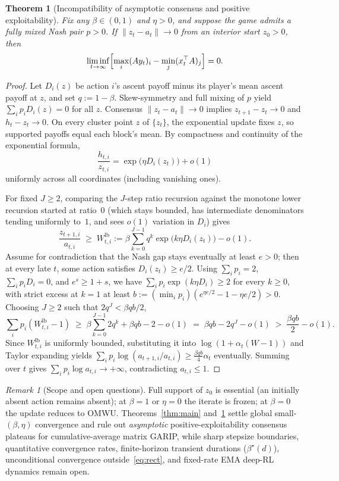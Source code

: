 \documentclass[11pt]{article}
\theoremstyle{plain}
\newtheorem{theorem}{Theorem}
\theoremstyle{definition}
\theoremstyle{remark}
\newtheorem{remark}{Remark}
\begin{document}
\begin{theorem}[Incompatibility of asymptotic consensus and positive exploitability]\label{thm:plateau}
Fix any $\beta \in (0, 1)$ and $\eta > 0$, and suppose the game admits a fully mixed Nash pair $p > 0$. If $\|z_t - a_t\| \to 0$ from an interior start $z_0 > 0$, then
\[
\liminf_{t \to \infty}\Bigl[\max_i (Ay_t)_i - \min_j (x_t^\top A)_j\Bigr] = 0.
\]
\end{theorem}

\begin{proof}
Let $D_i(z)$ be action $i$'s ascent payoff minus its player's mean ascent payoff at $z$, and set $q := 1 - \beta$. Skew-symmetry and full mixing of $p$ yield $\sum_i p_i D_i(z) = 0$ for all $z$. Consensus $\|z_t - a_t\| \to 0$ implies $z_{t+1} - z_t \to 0$ and $h_t - z_t \to 0$. On every cluster point $z$ of $\{z_t\}$, the exponential update fixes $z$, so supported payoffs equal each block's mean. By compactness and continuity of the exponential formula,
\[
\frac{h_{t,i}}{z_{t,i}} = \exp\bigl(\eta D_i(z_t)\bigr) + o(1)
\]
uniformly across all coordinates (including vanishing ones).

For fixed $J \ge 2$, comparing the $J$-step ratio recursion against the monotone lower recursion started at ratio~$0$ (which stays bounded, has intermediate denominators tending uniformly to~$1$, and sees $o(1)$ variation in $D_i$) gives
\[
\frac{z_{t+1,i}}{a_{t,i}} \;\ge\; W_{t,i}^{\mathrm{lb}} := \beta \sum_{k=0}^{J-1} q^k \exp\bigl(k\eta D_i(z_t)\bigr) - o(1).
\]
Assume for contradiction that the Nash gap stays eventually at least $e > 0$; then at every late $t$, some action satisfies $D_i(z_t) \ge e/2$. Using $\sum_i p_i = 2$, $\sum_i p_i D_i = 0$, and $e^s \ge 1 + s$, we have $\sum_i p_i \exp(k\eta D_i) \ge 2$ for every $k \ge 0$, with strict excess at $k = 1$ at least $b := (\min_i p_i)(e^{\eta e/2} - 1 - \eta e/2) > 0$. Choosing $J \ge 2$ such that $2q^J < \beta q b / 2$,
\[
\sum_i p_i (W_{t,i}^{\mathrm{lb}} - 1)
\;\ge\; \beta \sum_{k=0}^{J-1} 2q^k + \beta q b - 2 - o(1)
\;=\; \beta q b - 2q^J - o(1) \;>\; \frac{\beta q b}{2} - o(1).
\]
Since $W_{t,i}^{\mathrm{lb}}$ is uniformly bounded, substituting it into $\log(1 + \alpha_t(W - 1))$ and Taylor expanding yields $\sum_i p_i \log(a_{t+1,i}/a_{t,i}) \ge \frac{\beta q b}{4}\alpha_t$ eventually. Summing over $t$ gives $\sum_i p_i \log a_{t,i} \to +\infty$, contradicting $a_{t,i} \le 1$.
\end{proof}

\begin{remark}[Scope and open questions]
Full support of $z_0$ is essential (an initially absent action remains absent); at $\beta = 1$ or $\eta = 0$ the iterate is frozen; at $\beta = 0$ the update reduces to OMWU. Theorems~\ref{thm:main} and~\ref{thm:plateau} settle global small-$(\beta, \eta)$ convergence and rule out \emph{asymptotic} positive-exploitability consensus plateaus for cumulative-average matrix GARIP, while sharp stepsize boundaries, quantitative convergence rates, finite-horizon transient durations ($\beta^\star(d)$), unconditional convergence outside~\eqref{eq:rect}, and fixed-rate EMA deep-RL dynamics remain open.
\end{remark}
\end{document}
